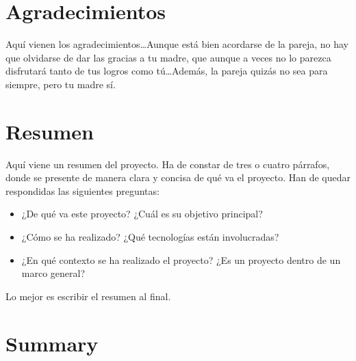 \documentclass[a4paper, 12pt]{book}
\begin{document}

\chapter*{Agradecimientos}

Aquí vienen los agradecimientos\ldots Aunque está bien acordarse de la pareja,
no hay que olvidarse de dar las gracias a tu madre, que aunque a veces no lo 
parezca disfrutará tanto de tus logros como tú\ldots Además, la pareja quizás
no sea para siempre, pero tu madre sí.


\chapter*{Resumen}

Aquí viene un resumen del proyecto. Ha de constar de tres o cuatro párrafos,
donde se presente de manera clara y concisa de qué va el proyecto. Han
de quedar respondidas las siguientes preguntas:

\begin{itemize}
  \item ¿De qué va este proyecto? ¿Cuál es su objetivo principal?
  \item ¿Cómo se ha realizado? ¿Qué tecnologías están involucradas?
  \item ¿En qué contexto se ha realizado el proyecto? ¿Es un proyecto
dentro de un marco general?
\end{itemize}

Lo mejor es escribir el resumen al final.


\chapter*{Summary}
\end{document}
